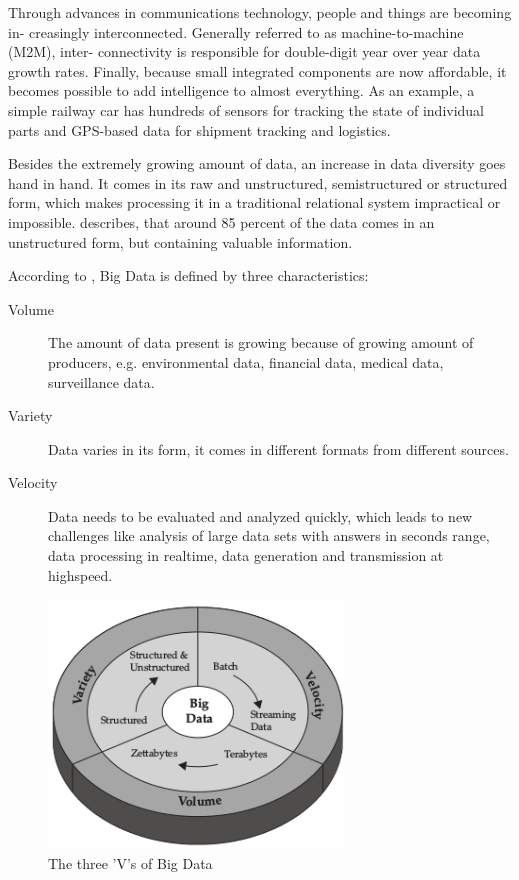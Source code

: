 Through advances in communications technology, people and things are becoming in-
creasingly interconnected. Generally referred to as machine-to-machine (M2M), inter-
connectivity is responsible for double-digit year over year data growth rates. Finally,
because small integrated components are now affordable, it becomes possible to add
intelligence to almost everything. As an example, a simple railway car has hundreds
of sensors for tracking the state of individual parts and GPS-based data for shipment
tracking and logistics.\cite{Ziko12}

Besides the extremely growing amount of data, an increase in data diversity goes hand
in hand. It comes in its raw and unstructured, semistructured or structured form, which
makes processing it in a traditional relational system impractical or impossible.\cite{Bitk12}
describes, that around 85 percent of the data comes in an unstructured form, but containing
valuable information.

According to \cite{Marz15} \cite{Ziko12}, Big Data is defined by three characteristics:
\begin{description}
    \item [Volume] The amount of data present is growing because of growing amount of producers,
    e.g. environmental data, financial data, medical data, surveillance data.
    \item [Variety] Data varies in its form, it comes in different formats from different sources.
    \item [Velocity] Data needs to be evaluated and analyzed quickly, which leads to new challenges
    like analysis of large data sets with answers in seconds range, data processing in
    realtime, data generation and transmission at highspeed.
\end{description}
\begin{figure}[H]
	\centering
	\includegraphics[width=0.7\textwidth]{../images/03-three-vs-of-bigdata.png}
	\caption{The three 'V's of Big Data{\cite{Ziko12}}}
	\label{three-vs-of-bigdata}
\end{figure}

